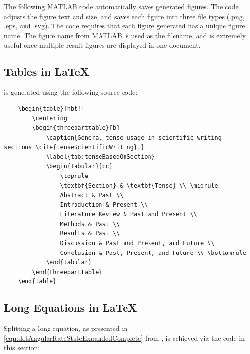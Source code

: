 The following MATLAB code automatically saves generated figures. 
The code adjusts the figure text and size, and saves each figure into three file types (.png, .eps, and .svg). 
The code requires that each figure generated has a unique figure name. The figure name from MATLAB is used as the filename, and is extremely useful once multiple result figures are displayed in one document. \cite{LaTeXSymbols}



\subsection{Tables in \LaTeX} \label{sec:appendixTables}

 is generated using the following source code:

\begin{verbatim}
	\begin{table}[hbt!]
		\centering
		\begin{threeparttable}[b]
			\caption{General tense usage in scientific writing sections \cite{tenseScientificWriting}.}
			\label{tab:tenseBasedOnSection}
			\begin{tabular}{cc}
				\toprule
				\textbf{Section} & \textbf{Tense} \\ \midrule
				Abstract & Past \\
				Introduction & Present \\
				Literature Review & Past and Present \\
				Methods & Past \\
				Results & Past \\
				Discussion & Past and Present, and Future \\
				Conclusion & Past, Present, and Future \\ \bottomrule
			\end{tabular}
		\end{threeparttable}
	\end{table}
\end{verbatim}


\subsection{Long Equations in \LaTeX} \label{sec:appendixLongEquation}

Splitting a long equation, as presented in \cref{eqn:dotAngularRateStateExpandedComplete} from \citeauthor{BenThesis} \cite{BenThesis}, is achieved via the code in this section:  

